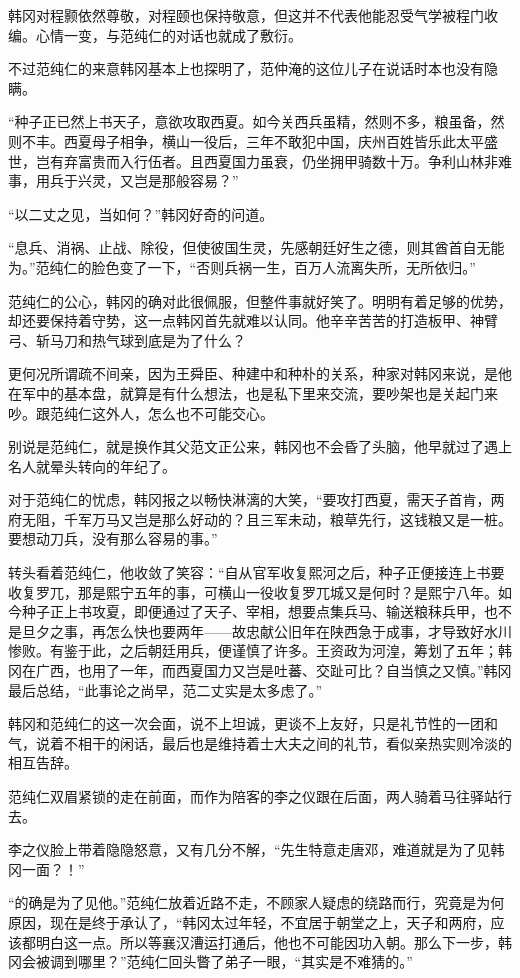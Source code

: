 韩冈对程颢依然尊敬，对程颐也保持敬意，但这并不代表他能忍受气学被程门收编。心情一变，与范纯仁的对话也就成了敷衍。

不过范纯仁的来意韩冈基本上也探明了，范仲淹的这位儿子在说话时本也没有隐瞒。

“种子正已然上书天子，意欲攻取西夏。如今关西兵虽精，然则不多，粮虽备，然则不丰。西夏母子相争，横山一役后，三年不敢犯中国，庆州百姓皆乐此太平盛世，岂有弃富贵而入行伍者。且西夏国力虽衰，仍坐拥甲骑数十万。争利山林非难事，用兵于兴灵，又岂是那般容易？”

“以二丈之见，当如何？”韩冈好奇的问道。

“息兵、消祸、止战、除役，但使彼国生灵，先感朝廷好生之德，则其酋首自无能为。”范纯仁的脸色变了一下，“否则兵祸一生，百万人流离失所，无所依归。”

范纯仁的公心，韩冈的确对此很佩服，但整件事就好笑了。明明有着足够的优势，却还要保持着守势，这一点韩冈首先就难以认同。他辛辛苦苦的打造板甲、神臂弓、斩马刀和热气球到底是为了什么？

更何况所谓疏不间亲，因为王舜臣、种建中和种朴的关系，种家对韩冈来说，是他在军中的基本盘，就算是有什么想法，也是私下里来交流，要吵架也是关起门来吵。跟范纯仁这外人，怎么也不可能交心。

别说是范纯仁，就是换作其父范文正公来，韩冈也不会昏了头脑，他早就过了遇上名人就晕头转向的年纪了。

对于范纯仁的忧虑，韩冈报之以畅快淋漓的大笑，“要攻打西夏，需天子首肯，两府无阻，千军万马又岂是那么好动的？且三军未动，粮草先行，这钱粮又是一桩。要想动刀兵，没有那么容易的事。”

转头看着范纯仁，他收敛了笑容：“自从官军收复熙河之后，种子正便接连上书要收复罗兀，那是熙宁五年的事，可横山一役收复罗兀城又是何时？是熙宁八年。如今种子正上书攻夏，即便通过了天子、宰相，想要点集兵马、输送粮秣兵甲，也不是旦夕之事，再怎么快也要两年——故忠献公旧年在陕西急于成事，才导致好水川惨败。有鉴于此，之后朝廷用兵，便谨慎了许多。王资政为河湟，筹划了五年；韩冈在广西，也用了一年，而西夏国力又岂是吐蕃、交趾可比？自当慎之又慎。”韩冈最后总结，“此事论之尚早，范二丈实是太多虑了。”

韩冈和范纯仁的这一次会面，说不上坦诚，更谈不上友好，只是礼节性的一团和气，说着不相干的闲话，最后也是维持着士大夫之间的礼节，看似亲热实则冷淡的相互告辞。

范纯仁双眉紧锁的走在前面，而作为陪客的李之仪跟在后面，两人骑着马往驿站行去。

李之仪脸上带着隐隐怒意，又有几分不解，“先生特意走唐邓，难道就是为了见韩冈一面？！”

“的确是为了见他。”范纯仁放着近路不走，不顾家人疑虑的绕路而行，究竟是为何原因，现在是终于承认了，“韩冈太过年轻，不宜居于朝堂之上，天子和两府，应该都明白这一点。所以等襄汉漕运打通后，他也不可能因功入朝。那么下一步，韩冈会被调到哪里？”范纯仁回头瞥了弟子一眼，“其实是不难猜的。”

